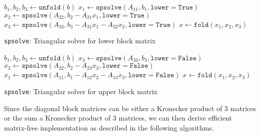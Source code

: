 \begin{algorithm}[H]
\DontPrintSemicolon
\SetAlgoLined
{}
\BlankLine

  $b_1, b_2, b_3 \gets \texttt{unfold}(b)$ \; 
  $x_1 \gets \texttt{spsolve}(A_{11}, b_1, \texttt{lower}=\texttt{True})$                                    
  $x_2 \gets \texttt{spsolve}(A_{22}, b_2 - A_{21} x_1, \texttt{lower}=\texttt{True})$                       
  $x_3 \gets \texttt{spsolve}(A_{33}, b_3 - A_{31} x_1 - A_{32} x_2, \texttt{lower}=\texttt{True})$          
  $x \gets \texttt{fold}(x_1, x_2, x_3)$ \; 

\caption{\texttt{spsolve}: Triangular solver for lower block matrix}
\end{algorithm} 

\begin{algorithm}[H]
\DontPrintSemicolon
\SetAlgoLined
{}
\BlankLine

  $b_1, b_2, b_3 \gets \texttt{unfold}(b)$ \; 
  $x_3 \gets \texttt{spsolve}(A_{33}, b_3, \texttt{lower}=\texttt{False})$                                    
  $x_2 \gets \texttt{spsolve}(A_{22}, b_2 - A_{23} x_3, \texttt{lower}=\texttt{False})$                       
  $x_1 \gets \texttt{spsolve}(A_{11}, b_1 - A_{12} x_2 - A_{13} x_3, \texttt{lower}=\texttt{False})$          
  $x \gets \texttt{fold}(x_1, x_2, x_3)$ \; 

\caption{\texttt{spsolve}: Triangular solver for upper block matrix}
\end{algorithm} 

Since the diagonal block matrices can be either a Kronecker product of 3 matrices or the sum a Kronecker product of 3 matrices, we can then derive efficient matrix-free implementation as described in the following algorithms.

